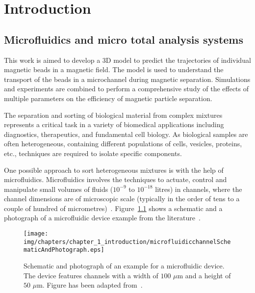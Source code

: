 \chapter{Introduction}\label{ch:introduction}

\section{Microfluidics and micro total analysis systems}\label{sec:microfluidicsAndMicroTotalAnalysisSystems}
This work is aimed to develop a 3D model to predict the trajectories of individual magnetic beads in a magnetic field. The model is used to understand the transport of the beads in a microchannel during magnetic separation. Simulations and experiments are combined to perform a comprehensive study of the effects of multiple parameters on the efficiency of magnetic particle separation. 

The separation and sorting of biological material from complex mixtures represents a critical task in a variety of biomedical applications including diagnostics, therapeutics, and fundamental cell biology. As biological samples are often heterogeneous, containing  different populations of cells, vesicles, proteins, etc., techniques are required to isolate specific components.

One possible approach to sort heterogeneous mixtures is with the help of microfluidics. Microfluidics involves the techniques to actuate, control and manipulate small volumes of fluids ($10^{-9}$ to $10^{-18}$ litres) in channels, where the channel dimensions are of microscopic scale (typically in the order of tens to a couple of hundred of micrometres)~\cite{Whitesides2006}. Figure~\ref{fig:microfluidicDeviceExample} shows a schematic and a photograph of a microfluidic device example from the literature~\cite{Geczy2019}.

\begin{figure}[htb]
\centering
\texttt{[image: img/chapters/chapter\_1\_introduction/microfluidicchannelSchematicAndPhotograph.eps]}
\caption[Example of a microfluidic device]{Schematic and photograph of an example for a microfluidic device. The device features channels with a width of $100$ $\mu$m and a height of $50$ $\mu$m. Figure has been adapted from~\cite{Geczy2019}.}
\label{fig:microfluidicDeviceExample}
\end{figure}

